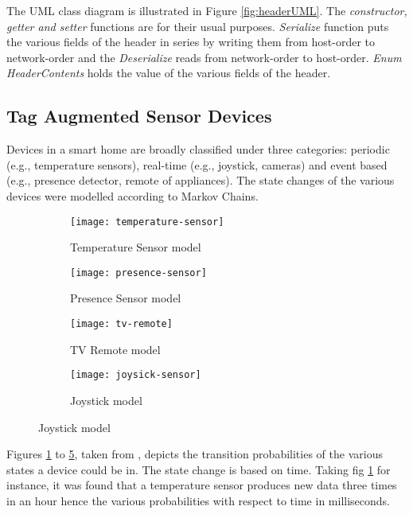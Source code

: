 The UML class diagram is illustrated in Figure \ref{fig:headerUML}. The \emph{
constructor, getter and setter} functions are for their usual purposes. \emph{
Serialize} function puts the various fields of the header in series by writing them
from host-order to network-order and the \emph{Deserialize} reads from network-order
to host-order. \emph{Enum HeaderContents} holds the value of the various fields of
the header.


\subsection{Tag Augmented Sensor Devices}
Devices in a smart home are broadly classified under three categories: periodic
(e.g., temperature sensors), real-time (e.g., joystick, cameras) and event based 
(e.g., presence detector, remote of appliances)\cite{Maselli}. The state changes
of the various devices were modelled according to Markov Chains\cite{Tolver}.
\begin{figure}[h]
    \begin{subfigure}[b]{.5\textwidth}
        \centering
        \texttt{[image: temperature-sensor]}
        \caption{Temperature Sensor model}
        \label{fig:temperature-sensor}
    \end{subfigure}
    \begin{subfigure}[b]{.5\textwidth}
        \centering
        \texttt{[image: presence-sensor]}
        \caption{Presence Sensor model}
        \label{fig:presence-sensor}
    \end{subfigure}
    \begin{subfigure}[b]{.5\textwidth}
        \centering
        \texttt{[image: tv-remote]}
        \caption{TV Remote model}
        \label{fig:tv-remote}
    \end{subfigure}
    \begin{subfigure}[b]{.5\textwidth}
        \centering
        \texttt{[image: joysick-sensor]}
        \caption{Joystick model}
        \label{fig:joysick-sensor}
    \end{subfigure}
\end{figure}
Figures \ref{fig:temperature-sensor} to \ref{fig:joysick-sensor}, taken from
\cite{Maselli}, depicts the transition probabilities of the various states a device
could be in. The state change is based on time. Taking fig \ref{fig:temperature-sensor}
for instance, it was found that a temperature sensor produces new data three times in
an hour hence the various probabilities with respect to time in milliseconds.\\\\

